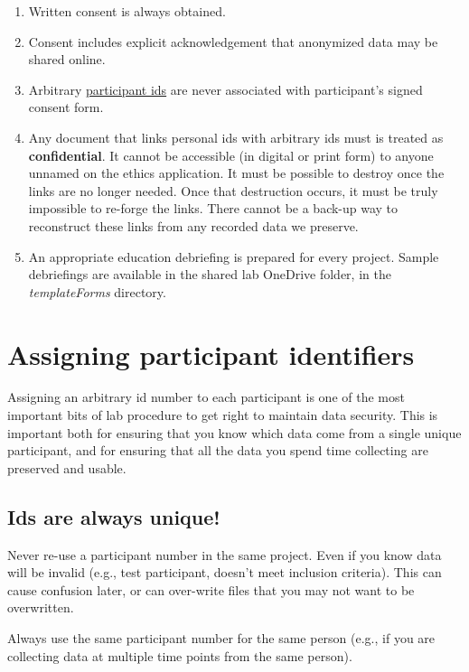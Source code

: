 \documentclass[12pt,]{book}
\theoremstyle{definition}
\theoremstyle{definition}
\theoremstyle{definition}
\theoremstyle{remark}
\begin{document}
\begin{enumerate}
\def\labelenumi{\arabic{enumi}.}
\item
  Written consent is always obtained.
\item
  Consent includes explicit acknowledgement that anonymized data may be
  shared online.
\item
  Arbitrary \protect\hyperlink{identifiers-and-data}{participant ids}
  are never associated with participant's signed consent form.
\item
  Any document that links personal ids with arbitrary ids must is
  treated as \textbf{confidential}. It cannot be accessible (in digital
  or print form) to anyone unnamed on the ethics application. It must be
  possible to destroy once the links are no longer needed. Once that
  destruction occurs, it must be truly impossible to re-forge the links.
  There cannot be a back-up way to reconstruct these links from any
  recorded data we preserve.
\item
  An appropriate education debriefing is prepared for every project.
  Sample debriefings are available in the shared lab OneDrive folder, in
  the \emph{templateForms} directory.
\end{enumerate}

\section{Assigning participant
identifiers}\label{assigning-participant-identifiers}

Assigning an arbitrary id number to each participant is one of the most
important bits of lab procedure to get right to maintain data security.
This is important both for ensuring that you know which data come from a
single unique participant, and for ensuring that all the data you spend
time collecting are preserved and usable.

\subsection{Ids are always unique!}\label{ids-are-always-unique}

Never re-use a participant number in the same project. Even if you know
data will be invalid (e.g., test participant, doesn't meet inclusion
criteria). This can cause confusion later, or can over-write files that
you may not want to be overwritten.

Always use the same participant number for the same person (e.g., if you
are collecting data at multiple time points from the same person).
\end{document}
